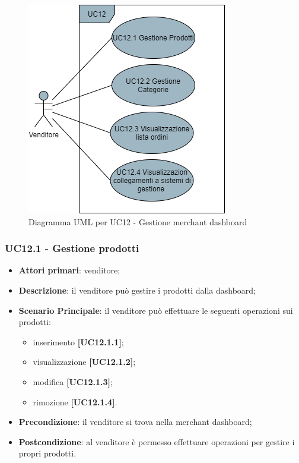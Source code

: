 \begin{figure}[H]
\centering
\includegraphics[scale=0.6]{res/UseCase/Immagini/MerchantDashboard}
\caption{Diagramma UML per UC12 - Gestione merchant dashboard}
\end{figure}

\subsubsection{UC12.1 - Gestione prodotti}
\begin{itemize}
\item \textbf{Attori primari}: venditore;
\item \textbf{Descrizione}: il venditore può gestire i prodotti dalla dashboard;
\item \textbf{Scenario Principale}: il venditore può effettuare le seguenti operazioni sui prodotti:
\begin{itemize}
	\item inserimento \textbf{[UC12.1.1]};
	\item visualizzazione \textbf{[UC12.1.2]};
	\item modifica \textbf{[UC12.1.3]};
	\item rimozione \textbf{[UC12.1.4]}.
\end{itemize}
\item \textbf{Precondizione}: il venditore si trova nella merchant dashboard;
\item \textbf{Postcondizione}: al venditore è permesso effettuare operazioni per gestire i propri prodotti.
\end{itemize}

